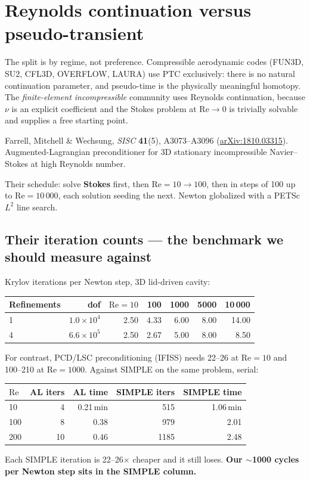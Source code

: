 \documentclass[11pt,a4paper]{article}
\newcommand{\Rey}{\mathrm{Re}}
\begin{document}
\section{Reynolds continuation versus pseudo-transient}

The split is by regime, not preference. Compressible aerodynamic codes (FUN3D, SU2, CFL3D,
OVERFLOW, LAURA) use PTC exclusively: there is no natural continuation parameter, and
pseudo-time is the physically meaningful homotopy. The \emph{finite-element incompressible}
community uses Reynolds continuation, because $\nu$ is an explicit coefficient and the Stokes
problem at $\Rey \to 0$ is trivially solvable and supplies a free starting point.

\begin{tcolorbox}[colback=blue!4,colframe=blue!50!black,title=\bfseries The reference for our regime]
Farrell, Mitchell \& Wechsung, \emph{SISC} \textbf{41}(5), A3073--A3096
(\href{https://arxiv.org/pdf/1810.03315}{arXiv:1810.03315}). Augmented-Lagrangian
preconditioner for 3D stationary incompressible Navier--Stokes at high Reynolds number.

\medskip
Their schedule: solve \textbf{Stokes} first, then $\Rey = 10 \to 100$, then in steps of 100 up
to $\Rey = 10\,000$, each solution seeding the next. Newton globalized with a PETSc $L^2$
line search.
\end{tcolorbox}

\subsection{Their iteration counts --- the benchmark we should measure against}
Krylov iterations per Newton step, 3D lid-driven cavity:
\begin{center}
\begin{tabular}{@{}lrrrrrr@{}}
\toprule
Refinements & dof & $\Rey{=}10$ & 100 & 1000 & 5000 & 10\,000 \\
\midrule
1 & $1.0\times10^4$ & 2.50 & 4.33 & 6.00 & 8.00 & 14.00 \\
4 & $6.6\times10^5$ & 2.50 & 2.67 & 5.00 & 8.00 & 8.50 \\
\bottomrule
\end{tabular}
\end{center}
For contrast, PCD/LSC preconditioning (IFISS) needs 22--26 at $\Rey{=}10$ and 100--210 at
$\Rey{=}1000$. Against SIMPLE on the same problem, serial:
\begin{center}
\begin{tabular}{@{}lrrrr@{}}
\toprule
$\Rey$ & AL iters & AL time & SIMPLE iters & SIMPLE time \\
\midrule
10 & 4 & 0.21\,min & 515 & 1.06\,min \\
100 & 8 & 0.38 & 979 & 2.01 \\
200 & 10 & 0.46 & 1185 & 2.48 \\
\bottomrule
\end{tabular}
\end{center}
Each SIMPLE iteration is 22--26$\times$ cheaper and it still loses.
\textbf{Our $\sim$1000 cycles per Newton step sits in the SIMPLE column.}
\end{document}
